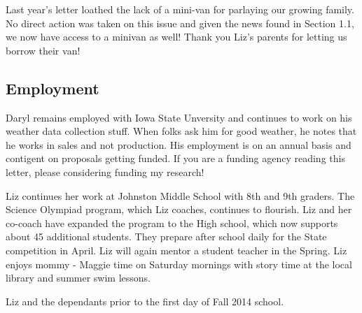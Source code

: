 \documentclass{article}
\makeatletter
\newenvironment{figurehere}
  {\def\@captype{figure}}
  {}
\makeatother
\begin{document}
\begin{multicols}{2}
Last year's letter loathed the lack of a mini-van for parlaying our 
growing family.  No direct action was taken on this issue and given the 
news found in Section 1.1, we now have access to a minivan as well!  Thank 
you Liz's parents for letting us borrow their van!

\subsection{Employment}
Daryl remains employed with Iowa State Unversity and continues to work on 
his weather data collection stuff.  When folks ask him for good weather, 
he notes that he works in sales and not production.  His employment is on 
an annual basis and contigent on proposals getting funded.  If you are a 
funding agency reading this letter, please considering funding my research!

Liz continues her work at Johnston Middle School with 8th and 9th graders. 
The Science Olympiad program, which Liz coaches, continues to flourish. 
Liz and her co-coach have expanded the program to the High school, which 
now supports about 45 additional students.  They prepare after school 
daily for the State competition in April.  Liz will again mentor a student 
teacher in the Spring.  Liz enjoys mommy - Maggie time on Saturday 
mornings with story time at the local library and summer swim lessons.

\begin{figurehere}
 \centering   
 \caption{Liz and the dependants prior to the first day of Fall 2014 
school.}
\end{figurehere}


\end{multicols}
\end{document}
